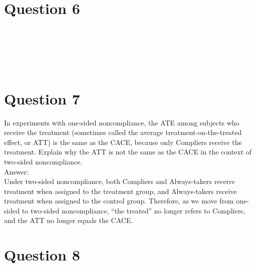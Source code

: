\documentclass[11pt,notitlepage]{article}\usepackage[]{graphicx}\usepackage[]{color}
\makeatletter
\newenvironment{kframe}{%
 \def\at@end@of@kframe{}%
 \ifinner\ifhmode%
  \def\at@end@of@kframe{\end{minipage}}%
  \begin{minipage}{\columnwidth}%
 \fi\fi%
 \def\FrameCommand##1{\hskip\@totalleftmargin \hskip-\fboxsep
 \colorbox{shadecolor}{##1}\hskip-\fboxsep
     \hskip-\linewidth \hskip-\@totalleftmargin \hskip\columnwidth}%
 \MakeFramed {\advance\hsize-\width
   \@totalleftmargin\z@ \linewidth\hsize
   \@setminipage}}%
 {\par\unskip\endMakeFramed%
 \at@end@of@kframe}
\newenvironment{knitrout}{}{} %
\makeatother
\begin{document}
\section*{Question 6}
\begin{knitrout}
\color{fgcolor}\begin{kframe}
\begin{verbatim}






\end{verbatim}
\end{kframe}
\end{knitrout}


\section*{Question 7}
In experiments with one-sided noncompliance, the ATE among subjects who receive the treatment (sometimes called the average treatment-on-the-treated effect, or ATT) is the same as the CACE, because only Compliers receive the treatment. Explain why the ATT is not the same as the CACE in the context of two-sided noncompliance.\\
Answer:\\
Under two-sided noncompliance, both Compliers and Always-takers receive treatment when assigned to the treatment group, and Always-takers receive treatment when assigned to the control group. Therefore, as we move from one-sided to two-sided noncompliance, ``the treated'' no longer refers to Compliers, and the ATT no longer equals the CACE.

\section*{Question 8}
\begin{knitrout}
\color{fgcolor}\begin{kframe}
\begin{verbatim}






\end{verbatim}
\end{kframe}
\end{knitrout}
\end{document}
